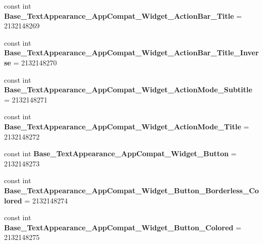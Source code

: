 \begin{DoxyCompactItemize}
\item 
\mbox{\label{classst_delivery_1_1_resource_1_1_style_a37de4195d6cd2e0a2ad70972b25cfc51}} 
const int {\bfseries Base\+\_\+\+Text\+Appearance\+\_\+\+App\+Compat\+\_\+\+Widget\+\_\+\+Action\+Bar\+\_\+\+Title} = 2132148269
\item 
\mbox{\label{classst_delivery_1_1_resource_1_1_style_a050851429a73d13a73e7694e3e91261f}} 
const int {\bfseries Base\+\_\+\+Text\+Appearance\+\_\+\+App\+Compat\+\_\+\+Widget\+\_\+\+Action\+Bar\+\_\+\+Title\+\_\+\+Inverse} = 2132148270
\item 
\mbox{\label{classst_delivery_1_1_resource_1_1_style_a404e15f6dfa5bb33f34bd3fd2d98f59c}} 
const int {\bfseries Base\+\_\+\+Text\+Appearance\+\_\+\+App\+Compat\+\_\+\+Widget\+\_\+\+Action\+Mode\+\_\+\+Subtitle} = 2132148271
\item 
\mbox{\label{classst_delivery_1_1_resource_1_1_style_aa5675ee8d2364a492007f8088cb24f8c}} 
const int {\bfseries Base\+\_\+\+Text\+Appearance\+\_\+\+App\+Compat\+\_\+\+Widget\+\_\+\+Action\+Mode\+\_\+\+Title} = 2132148272
\item 
\mbox{\label{classst_delivery_1_1_resource_1_1_style_aee8599143016dfcef337f8ec13b7e81c}} 
const int {\bfseries Base\+\_\+\+Text\+Appearance\+\_\+\+App\+Compat\+\_\+\+Widget\+\_\+\+Button} = 2132148273
\item 
\mbox{\label{classst_delivery_1_1_resource_1_1_style_a5c0b2c93ca07890d9fbcb115f84481a3}} 
const int {\bfseries Base\+\_\+\+Text\+Appearance\+\_\+\+App\+Compat\+\_\+\+Widget\+\_\+\+Button\+\_\+\+Borderless\+\_\+\+Colored} = 2132148274
\item 
\mbox{\label{classst_delivery_1_1_resource_1_1_style_ae2becc9ac8cd21763cd4aed2c88536b2}} 
const int {\bfseries Base\+\_\+\+Text\+Appearance\+\_\+\+App\+Compat\+\_\+\+Widget\+\_\+\+Button\+\_\+\+Colored} = 2132148275
\item 
\mbox{\label{classst_delivery_1_1_resource_1_1_style_a0a60c29754120f90764407effa93dcbb}} 

\end{DoxyCompactItemize}
